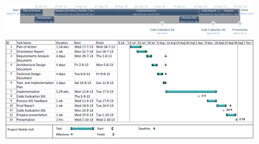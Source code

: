 \begin{figure}[ht!]
\hspace*{-1in}
\includegraphics[width=170mm]{../../Planning/timeline.png}
\hspace*{-1in}
\includegraphics[width=170mm]{../../Planning/ProjectPlanning.png}
\end{figure}

